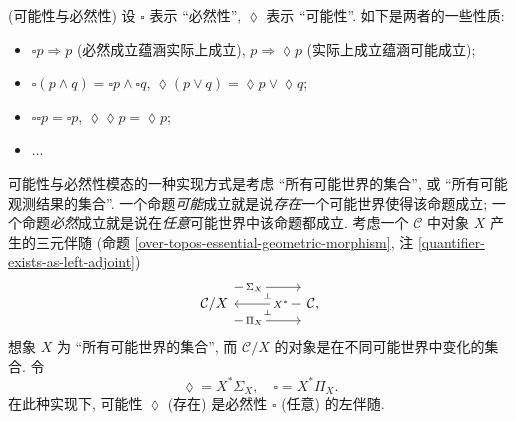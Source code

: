 \begin{example}
	{(可能性与必然性)}
	设 $\square$ 表示 ``必然性'', $\lozenge$ 表示 ``可能性''. 如下是两者的一些性质:
	\begin{itemize}
		\item $\square p \Rightarrow p$ (必然成立蕴涵实际上成立), $p\Rightarrow \lozenge p$ (实际上成立蕴涵可能成立);
		\item $\square (p \land q) = \square p \land \square q$, $\lozenge (p\lor q) = \lozenge p \lor \lozenge q$;
		\item $\square\square p = \square p$, $\lozenge\lozenge p =\lozenge p$;
		\item ...
	\end{itemize}
	可能性与必然性模态的一种实现方式是考虑 ``所有可能世界的集合'', 或 ``所有可能观测结果的集合''. 一个命题\emph{可能}成立就是说\emph{存在}一个可能世界使得该命题成立; 一个命题\emph{必然}成立就是说在\emph{任意}可能世界中该命题都成立.
	考虑一个\topos{} $\mathcal C$ 中对象 $X$ 产生的三元伴随 (命题 \ref{over-topos-essential-geometric-morphism}, 注 \ref{quantifier-exists-as-left-adjoint})
	\[\begin{tikzcd}[ampersand replacement=\&,background color=\examplecolor]
		{\mathcal C/X} \&\& {\mathcal C,}
		\arrow[""{name=0, anchor=center, inner sep=0}, "{X^*}"{description, pos=0.3}, from=1-3, to=1-1]
		\arrow[""{name=1, anchor=center, inner sep=0}, "{\Sigma_X}"{description, pos=0.3}, shift left=5, from=1-1, to=1-3]
		\arrow[""{name=2, anchor=center, inner sep=0}, "{\Pi_X}"{description, pos=0.3}, shift right=5, from=1-1, to=1-3]
		\arrow["\dashv"{anchor=center, rotate=-90}, draw=none, from=1, to=0]
		\arrow["\dashv"{anchor=center, rotate=-90}, draw=none, from=0, to=2]
	\end{tikzcd}\]
	想象 $X$ 为 ``所有可能世界的集合'', 而 $\mathcal C/X$ 的对象是在不同可能世界中变化的集合. 令
	$$
	\lozenge = X^*\Sigma_X,\quad
	\square = X^*\Pi_X.
	$$
	在此种实现下, 可能性 $\lozenge$ (存在) 是必然性 $\square$ (任意) 的左伴随.
\end{example}
